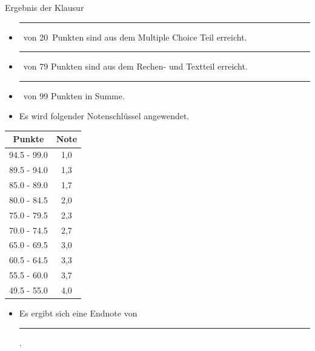 \documentclass[a4paper, 9pt]{scrartcl}\usepackage[]{graphicx}\usepackage[]{xcolor}
\begin{document}
\begin{graybox}{Ergebnis der Klausur}
  \vspace{1Ex}
  \begin{itemize}
  \item[] \rule[0ex]{3em}{.4pt}\, von 20\, Punkten sind aus dem Multiple
    Choice Teil erreicht.
  \item[] \rule[0ex]{3em}{.4pt}\, von 79 Punkten sind aus dem Rechen- und
    Textteil erreicht. 
  \item[] \rule[0ex]{3em}{.4pt}\, von 99 Punkten in Summe.
  \item[] Es wird folgender Notenschl{\"u}ssel angewendet.   
  \end{itemize}
  \vspace{1ex}
\begin{center}
  \begin{tabular}[c]{cc}
    \toprule
    \textbf{Punkte}	&	\textbf{Note}	\\
    \midrule
    94.5 - 99.0	&	1,0	\\
    89.5 - 94.0	&	1,3	\\
    85.0 - 89.0	&	1,7	\\
    80.0 - 84.5	&	2,0	\\
    75.0 - 79.5	&	2,3	\\
    70.0 - 74.5	&	2,7	\\
    65.0 - 69.5	&	3,0	\\
    60.5 - 64.5	&	3,3	\\
    55.5 - 60.0	&	3,7	\\
    49.5 - 55.0	&	4,0	\\
    \bottomrule
  \end{tabular}
\end{center}
  \vspace{1ex}
\begin{itemize}
\item[] Es ergibt sich eine Endnote von \rule[0ex]{4em}{.4pt}.
\end{itemize}
  \vspace{1Ex}
\end{graybox}

\newpage
\end{document}
